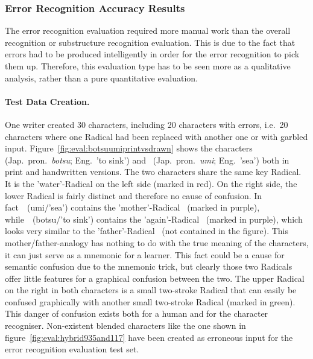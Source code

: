 \subsubsection{Error Recognition Accuracy Results}
\label{sec:eval:resulterrorrecognition}

The error recognition evaluation required more manual work than the overall 
recognition or substructure recognition evaluation. This is due to the fact
that errors had to be produced intelligently in order for the error recognition
to pick them up. Therefore, this evaluation type has to be seen more as a 
qualitative analysis, rather than a pure quantitative evaluation.

\paragraph{Test Data Creation.}
One writer created 30 characters, including 20 characters with errors,
i.e.\ 20 characters where one Radical had been replaced with another one
or with garbled input. Figure~\ref{fig:eval:botsuumiprintvsdrawn} shows the
characters~ (Jap.\ pron.\ \emph{botsu}; Eng.\ 'to sink') %
and~ (Jap.\ pron.\ \emph{umi}; Eng.\ 'sea') %
both in print and handwritten versions.
The two characters share the same key Radical. It is the 'water'-Radical 
on the left side (marked in red). 
On the right side, the lower Radical is fairly distinct
and therefore no cause of confusion. In fact~~(umi/'sea') contains the 
'mother'-Radical~ (marked in purple), 
while~~(botsu/'to sink') contains the 
'again'-Radical~ (marked in purple), 
which looks very similar to the 
'father'-Radical~ (not contained in the figure).
This mother/father-analogy has nothing to do with the true meaning
of the characters, it can just serve as a mnemonic for a learner.
This fact could be a cause for semantic confusion due to the 
mnemonic trick, but clearly those two Radicals offer little features 
for a graphical confusion between the two.
The upper Radical on the right in both characters is a small two-stroke
Radical that can easily be confused graphically with another small two-stroke 
Radical (marked in green). This danger of confusion exists both for a human
and for the character recogniser. 
Non-existent blended characters like the one shown in 
figure~\ref{fig:eval:hybrid935and117} have been created as erroneous input
for the error recognition evaluation test set.
